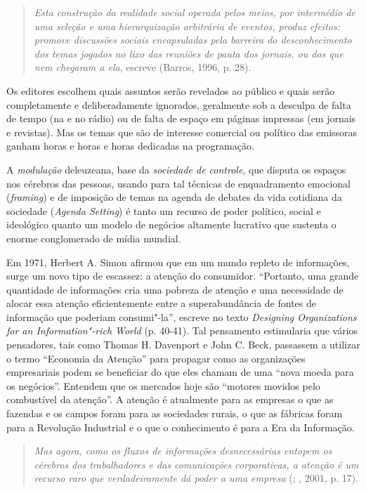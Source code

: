 \begin{quote}
\emph{Esta construção da realidade social operada pelos meios, por
intermédio de uma seleção e uma hierarquização arbitrária de eventos,
produz efeitos: promove discussões sociais encapsuladas pela barreira do
desconhecimento dos temas jogados no lixo das reuniões de pauta dos
jornais, ou dos que nem chegaram a ela}, escreve (Barros, 1996, p. 28).
\end{quote}

Os editores escolhem quais assuntos serão revelados ao público e quais
serão completamente e deliberadamente ignorados, geralmente sob a
desculpa de falta de tempo (na  e no rádio) ou de falta de espaço em
páginas impressas (em jornais e revistas). Mas os temas que são de
interesse comercial ou político das emissoras ganham horas e horas e
horas dedicadas na programação.

A \emph{modulação} deleuzeana, base da \emph{sociedade de controle}, que
disputa os espaços nos cérebros das pessoas, usando para tal técnicas de
enquadramento emocional (\emph{framing}) e de imposição de temas na
agenda de debates da vida cotidiana da sociedade (\emph{Agenda Setting})
é tanto um recurso de poder político, social e ideológico quanto um
modelo de negócios altamente lucrativo que sustenta o enorme
conglomerado de mídia mundial.

Em 1971, Herbert A. Simon afirmou que em um mundo repleto de
informações, surge um novo tipo de escassez: a atenção do consumidor.
``Portanto, uma grande quantidade de informações cria uma pobreza de
atenção e uma necessidade de alocar essa atenção eficientemente entre a
superabundância de fontes de informação que poderiam consumi"-la'',
escreve no texto \emph{Designing Organizations for an Information"-rich
World} (p. 40-41). Tal pensamento estimularia que vários pensadores,
tais como Thomas H. Davenport e John C. Beck, passassem a utilizar o
termo ``Economia da Atenção'' para propagar como as organizações
empresariais podem se beneficiar do que eles chamam de uma ``nova moeda
para os negócios''. Entendem que os mercados hoje são ``motores movidos
pelo combustível da atenção''. A atenção é atualmente para as empresas o
que as fazendas e os campos foram para as sociedades rurais, o que as
fábricas foram para a Revolução Industrial e o que o conhecimento é para
a Era da Informação.

\begin{quote}
\emph{Mas agora, como os fluxos de informações desnecessárias entopem os
cérebros dos trabalhadores e das comunicações corporativas, a atenção é
um recurso raro que verdadeiramente dá poder a uma empresa} (;
, 2001, p. 17).
\end{quote}

